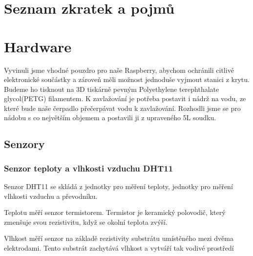 \documentclass[12pt,a4paper]{article}
\begin{document}
\section{Seznam zkratek a pojmů}
\begin{acronym}
\end{acronym}

\clearpage

\section{Hardware}

Vyvinuli jsme vhodné pouzdro pro naše Raspberry, abychom ochránili citlivé elektronické součástky a zároveň měli možnost jednoduše vyjmout stanici z krytu. Budeme ho tisknout na 3D tiskárně pevným Polyethylene terephthalate glycol(PETG) filamentem. K zavlažování je potřeba postavit i nádrž na vodu, ze které bude naše čerpadlo přečerpávat vodu k zavlažování. Rozhodli jsme se pro nádobu s co největším objemem a postavili ji z upraveného 5L soudku.

\subsection{Senzory}

\subsubsection{Senzor teploty a vlhkosti vzduchu DHT11}

Senzor \ac{DHT11} se skládá z jednotky pro měření teploty, jednotky pro měření vlhkosti vzduchu a převodníku.

Teplotu měří senzor termistorem. Termistor je keramický polovodič, který zmenšuje svou rezistivitu, když se okolní teplota zvýší.

Vlhkost měří senzor na základě rezistivity substrátu umístěného mezi dvěma elektrodami. Tento substrát zachytává vlhkost a vytváří tak vodivé prostředí
\end{document}
